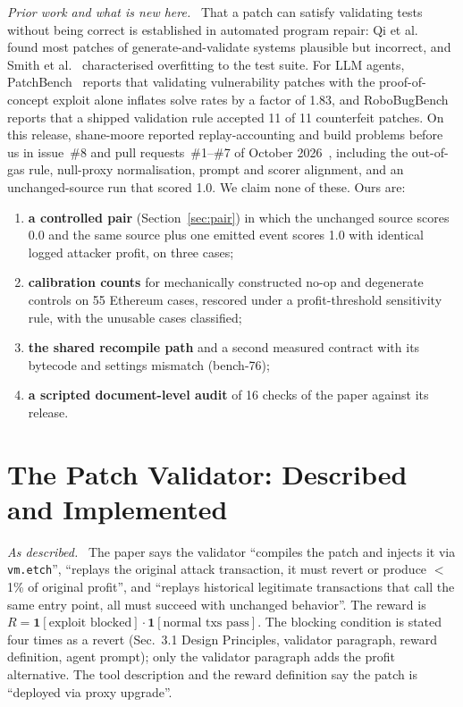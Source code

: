 \documentclass[conference]{IEEEtran}
\newcommand{\code}[1]{\texttt{#1}}
\newcommand{\para}[1]{\textit{#1.}\ }
\begin{document}
\para{Prior work and what is new here} That a patch can satisfy validating tests without being correct is established in automated program repair: Qi et al.~\cite{qi2015} found most patches of generate-and-validate systems plausible but incorrect, and Smith et al.~\cite{smith2015} characterised overfitting to the test suite. For LLM agents, PatchBench~\cite{patchbench} reports that validating vulnerability patches with the proof-of-concept exploit alone inflates solve rates by a factor of 1.83, and RoboBugBench~\cite{robobugbench} reports that a shipped validation rule accepted 11 of 11 counterfeit patches. On this release, shane-moore reported replay-accounting and build problems before us in issue~\#8 and pull requests~\#1--\#7 of October 2026~\cite{moore}, including the out-of-gas rule, null-proxy normalisation, prompt and scorer alignment, and an unchanged-source run that scored 1.0. We claim none of these. Ours are:
\begin{enumerate}
\item \textbf{a controlled pair} (Section~\ref{sec:pair}) in which the unchanged source scores 0.0 and the same source plus one emitted event scores 1.0 with identical logged attacker profit, on three cases;
\item \textbf{calibration counts} for mechanically constructed no-op and degenerate controls on 55 Ethereum cases, rescored under a profit-threshold sensitivity rule, with the unusable cases classified;
\item \textbf{the shared recompile path} and a second measured contract with its bytecode and settings mismatch (bench-76);
\item \textbf{a scripted document-level audit} of 16 checks of the paper against its release.
\end{enumerate}

\section{The Patch Validator: Described and Implemented}
\label{sec:oracle}
\para{As described} The paper says the validator ``compiles the patch and injects it via \code{vm.etch}'', ``replays the original attack transaction, it must revert or produce $<$1\% of original profit'', and ``replays historical legitimate transactions that call the same entry point, all must succeed with unchanged behavior''. The reward is $R=\mathbf{1}[\text{exploit blocked}]\cdot\mathbf{1}[\text{normal txs pass}]$. The blocking condition is stated four times as a revert (Sec.~3.1 Design Principles, validator paragraph, reward definition, agent prompt); only the validator paragraph adds the profit alternative. The tool description and the reward definition say the patch is ``deployed via proxy upgrade''.
\end{document}
